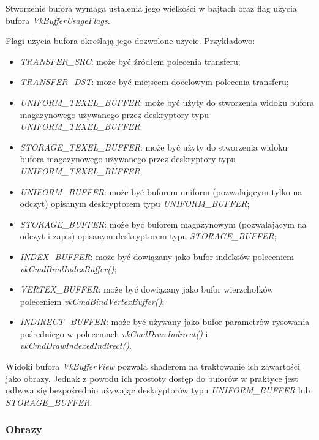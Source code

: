 Stworzenie bufora wymaga ustalenia jego wielkości w bajtach oraz flag użycia bufora \textit{VkBufferUsageFlags}.

Flagi użycia bufora określają jego dozwolone użycie.
Przykładowo:
\begin{itemize}
	\item \textit{TRANSFER\_SRC}: może być źródłem polecenia transferu;
	\item \textit{TRANSFER\_DST}: może być miejscem docelowym polecenia transferu;
	\item \textit{UNIFORM\_TEXEL\_BUFFER}: może być użyty do stworzenia widoku bufora magazynowego używanego przez deskryptory typu \textit{UNIFORM\_TEXEL\_BUFFER};
	\item \textit{STORAGE\_TEXEL\_BUFFER}: może być użyty do stworzenia widoku bufora magazynowego używanego przez deskryptory typu \textit{UNIFORM\_TEXEL\_BUFFER};
	\item \textit{UNIFORM\_BUFFER}: może być buforem uniform (pozwalającym tylko na odczyt) opisanym deskryptorem typu \textit{UNIFORM\_BUFFER};
	\item \textit{STORAGE\_BUFFER}: może być buforem magazynowym (pozwalającym na odczyt i zapis) opisanym deskryptorem typu \textit{STORAGE\_BUFFER};
	\item \textit{INDEX\_BUFFER}: może być dowiązany jako bufor indeksów poleceniem \textit{vkCmdBindIndexBuffer()};
	\item \textit{VERTEX\_BUFFER}: może być dowiązany jako bufor wierzchołków poleceniem \textit{vkCmdBindVertexBuffer()};
	\item \textit{INDIRECT\_BUFFER}: może być używany jako bufor parametrów rysowania pośredniego w poleceniach \textit{vkCmdDrawIndirect()} i \textit{vkCmdDrawIndexedIndirect()}.
\end{itemize}

Widoki bufora \textit{VkBufferView} pozwala shaderom na traktowanie ich zawartości jako obrazy.
Jednak z powodu ich prostoty dostęp do buforów w praktyce jest odbywa się bezpośrednio używając deskryptorów typu \textit{UNIFORM\_BUFFER} lub \textit{STORAGE\_BUFFER}.

\subsubsection{Obrazy}

